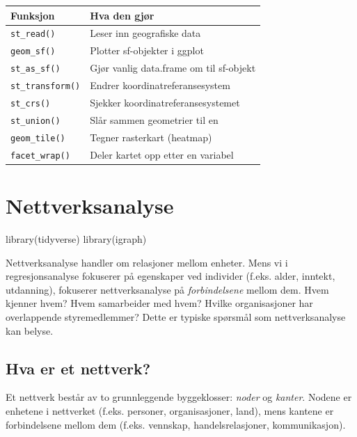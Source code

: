 \documentclass[
  norsk,
  letterpaper,
  DIV=11,
  numbers=noendperiod]{scrreprt}
\newenvironment{Shaded}{\begin{snugshade}}{\end{snugshade}}
\newcommand{\FunctionTok}[1]{\textcolor[rgb]{0.28,0.35,0.67}{#1}}
\newcommand{\NormalTok}[1]{\textcolor[rgb]{0.00,0.23,0.31}{#1}}
\theoremstyle{definition}
\theoremstyle{remark}
\begin{document}
\begin{longtable}[]{@{}ll@{}}
\toprule\noalign{}
Funksjon & Hva den gjør \\
\midrule\noalign{}
\endhead
\bottomrule\noalign{}
\endlastfoot
\texttt{st\_read()} & Leser inn geografiske data \\
\texttt{geom\_sf()} & Plotter sf-objekter i ggplot \\
\texttt{st\_as\_sf()} & Gjør vanlig data.frame om til sf-objekt \\
\texttt{st\_transform()} & Endrer koordinatreferansesystem \\
\texttt{st\_crs()} & Sjekker koordinatreferansesystemet \\
\texttt{st\_union()} & Slår sammen geometrier til en \\
\texttt{geom\_tile()} & Tegner rasterkart (heatmap) \\
\texttt{facet\_wrap()} & Deler kartet opp etter en variabel \\
\end{longtable}

\chapter{Nettverksanalyse}\label{nettverksanalyse}

\begin{Shaded}
\begin{Highlighting}[]
\FunctionTok{library}\NormalTok{(tidyverse)}
\FunctionTok{library}\NormalTok{(igraph)}
\end{Highlighting}
\end{Shaded}

Nettverksanalyse handler om relasjoner mellom enheter. Mens vi i
regresjonsanalyse fokuserer på egenskaper ved individer (f.eks. alder,
inntekt, utdanning), fokuserer nettverksanalyse på \emph{forbindelsene}
mellom dem. Hvem kjenner hvem? Hvem samarbeider med hvem? Hvilke
organisasjoner har overlappende styremedlemmer? Dette er typiske
spørsmål som nettverksanalyse kan belyse.

\section{Hva er et nettverk?}\label{hva-er-et-nettverk}

Et nettverk består av to grunnleggende byggeklosser: \emph{noder} og
\emph{kanter}. Nodene er enhetene i nettverket (f.eks. personer,
organisasjoner, land), mens kantene er forbindelsene mellom dem (f.eks.
vennskap, handelsrelasjoner, kommunikasjon).
\end{document}
